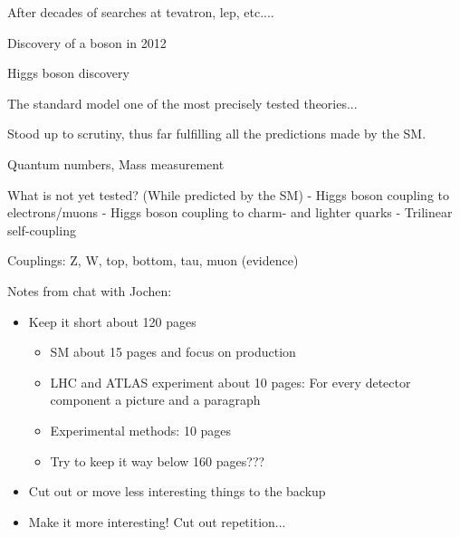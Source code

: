 After decades of searches at tevatron, lep, etc....

Discovery of a boson \cite{HIGG-2012-27,CMS-HIG-12-028} in 2012

Higgs boson discovery



The standard model one of the most precisely tested theories...

Stood up to scrutiny, thus far fulfilling all the predictions made by the SM.

Quantum numbers, Mass measurement

What is not yet tested? (While predicted by the SM)
- Higgs boson coupling to electrons/muons
- Higgs boson coupling to charm- and lighter quarks
- Trilinear self-coupling


Couplings: Z, W, top, bottom, tau, muon (evidence)

\clearpage



Notes from chat with Jochen:
\begin{itemize}

\item Keep it short \ra about 120 pages
  \begin{itemize}
  \item SM about 15 pages and focus on \HH production

  \item LHC and ATLAS experiment about 10 pages: For every detector
    component a picture and a paragraph

  \item Experimental methods: 10 pages

  \item Try to keep it way below 160 pages???
  \end{itemize}

\item Cut out or move less interesting things to the backup

\item Make it more interesting! Cut out repetition...

\end{itemize}


